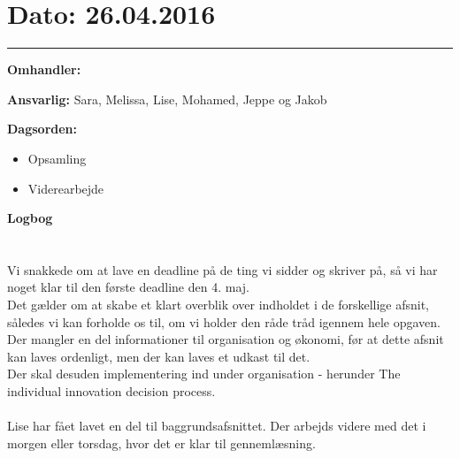 \section{Dato: 26.04.2016}
\hrule

\textbf{Omhandler:}

\textbf{Ansvarlig:} Sara, Melissa, Lise, Mohamed, Jeppe og Jakob

\textbf{Dagsorden:}
\begin{itemize}
	\item Opsamling
	\item Viderearbejde
\end{itemize}

\textbf{Logbog}
\\
\\ \\
Vi snakkede om at lave en deadline på de ting vi sidder og skriver på, så vi har noget klar til den første deadline den 4. maj.\\
Det gælder om at skabe et klart overblik over indholdet i de forskellige afsnit, således vi kan forholde os til, om vi holder den råde tråd igennem hele opgaven.\\
Der mangler en del informationer til organisation og økonomi, før at dette afsnit kan laves ordenligt, men der kan laves et udkast til det.\\
Der skal desuden implementering ind under organisation - herunder The individual innovation decision process.\\ \\

Lise har fået lavet en del til baggrundsafsnittet. Der arbejds videre med det i morgen eller torsdag, hvor det er klar til gennemlæsning. 



